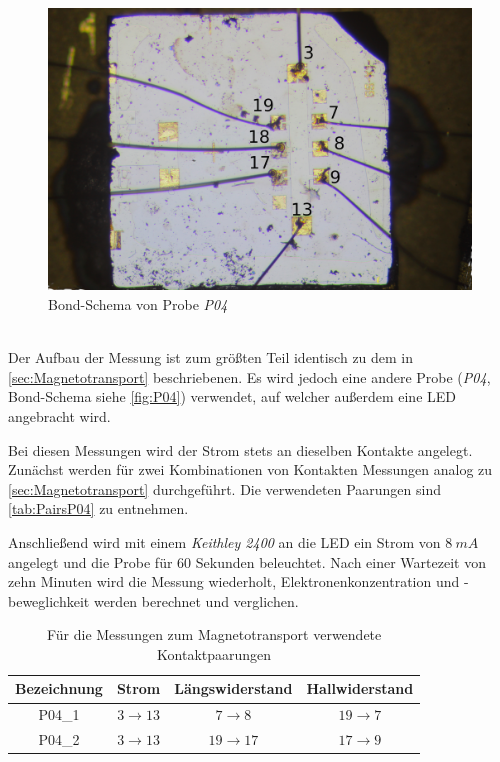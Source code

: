 \begin{figure}
\includegraphics[scale=0.05]{Pictures/P04BondSchema}
\caption{Bond-Schema von Probe \emph{P04}}
\label{fig:P04}
\end{figure}
\hfill\\
Der Aufbau der Messung ist zum größten Teil identisch zu dem in \autoref{sec:Magnetotransport} beschriebenen. Es wird jedoch eine andere Probe (\emph{P04}, Bond-Schema siehe \autoref{fig:P04}) verwendet, auf welcher außerdem eine LED angebracht wird.

Bei diesen Messungen wird der Strom stets an dieselben Kontakte angelegt.
Zunächst werden für zwei Kombinationen von Kontakten Messungen analog zu \autoref{sec:Magnetotransport} durchgeführt. Die verwendeten Paarungen sind \autoref{tab:PairsP04} zu entnehmen.

Anschließend wird mit einem \emph{Keithley 2400} an die LED ein Strom von $8\ \si{mA}$ angelegt und die Probe für $60$ Sekunden beleuchtet.
Nach einer Wartezeit von zehn Minuten wird die Messung wiederholt,
Elektronenkonzentration und -beweglichkeit werden berechnet und verglichen.

\begin{table}[ht]
\caption{Für die Messungen zum Magnetotransport verwendete Kontaktpaarungen}
\label{tab:PairsP04}
\centering
\begin{tabular}{cccc}
\toprule
Bezeichnung & Strom & Längswiderstand & Hallwiderstand\\
\midrule
P04\_1 & $3\rightarrow 13$ & $7\rightarrow 8$ & $19\rightarrow 7$\\
P04\_2 & $3\rightarrow 13$ & $19\rightarrow 17$ & $17\rightarrow 9$\\
\bottomrule
\end{tabular}
\end{table}
